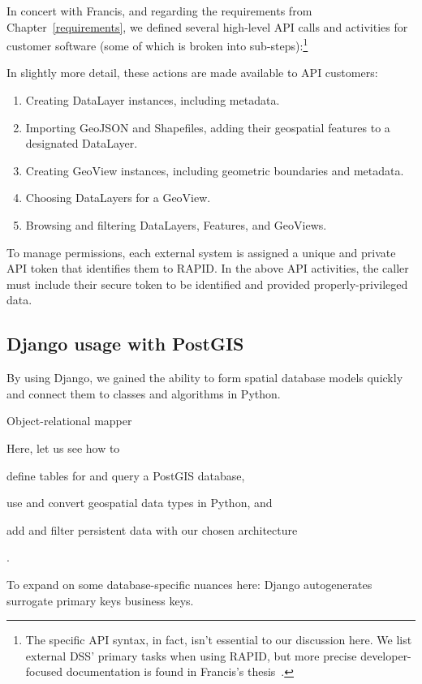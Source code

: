 In concert with Francis, and regarding the requirements from Chapter~\ref{requirements}, we defined several high-level API calls and activities for customer software (some of which is broken into sub-steps):\footnote{The specific API syntax, in fact, isn't essential to our discussion here. We list external DSS' primary tasks when using RAPID, but more precise developer-focused documentation is found in Francis's thesis~\cite{Francis}.}

In slightly more detail, these actions are made available to API customers:

\begin{enumerate}
  \item Creating DataLayer instances, including metadata.
  \item Importing GeoJSON and Shapefiles, adding their geospatial features to a designated DataLayer.
  \item Creating GeoView instances, including geometric boundaries and metadata.
  \item Choosing DataLayers for a GeoView.
  \item Browsing and filtering DataLayers, Features, and GeoViews.
\end{enumerate}

To manage permissions, each external system is assigned a unique and private API token that identifies them to RAPID. In the above API activities, the caller must include their secure token to be identified and provided properly-privileged data.

\subsection{Django usage with PostGIS}
By using Django, we gained the ability to form spatial database models quickly and connect them to classes and algorithms in Python.

Object-relational mapper

Here, let us see how to
\begin{enumerate*}[label=\itshape\alph*\upshape)]
\item define tables for and query a PostGIS database,
\item use and convert geospatial data types in Python, and
\item add and filter persistent data with our chosen architecture
\end{enumerate*}.



To expand on some database-specific nuances here: Django autogenerates surrogate primary keys business keys.

